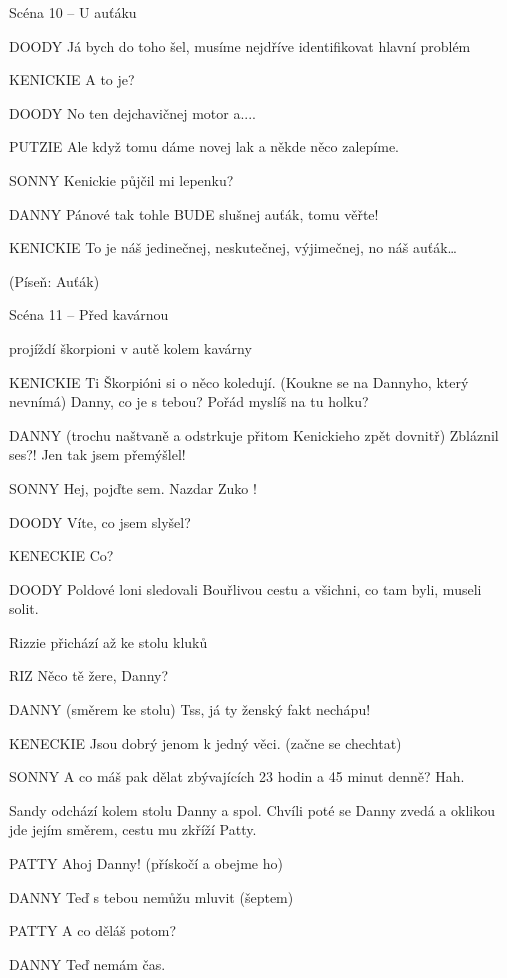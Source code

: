 Scéna 10 – U auťáku

DOODY        Já bych do toho šel, musíme nejdříve identifikovat hlavní problém

KENICKIE        A to je?

DOODY        No ten dejchavičnej motor a.... 

PUTZIE         Ale když tomu dáme novej lak a někde něco zalepíme. 

SONNY        Kenickie půjčil mi lepenku? 

DANNY         Pánové tak tohle BUDE  slušnej auťák, tomu věřte!

KENICKIE        To je náš jedinečnej, neskutečnej, výjimečnej, no náš auťák…

                 (Píseň: Auťák) 

Scéna 11 – Před kavárnou 

projíždí škorpioni v autě kolem kavárny 

KENICKIE         Ti Škorpióni si o něco koledují. (Koukne se na Dannyho, který nevnímá)                 Danny, co je s tebou? Pořád myslíš na tu holku?

DANNY         (trochu naštvaně a odstrkuje přitom Kenickieho zpět dovnitř) Zbláznil         ses?! Jen tak jsem přemýšlel! 

SONNY         Hej, pojďte sem. Nazdar Zuko !  

DOODY         Víte, co jsem slyšel? 

KENECKIE        Co? 

DOODY         Poldové loni sledovali Bouřlivou cestu a všichni, co tam byli, museli solit. 

Rizzie přichází až ke stolu kluků 

RIZ         Něco tě žere, Danny? 

DANNY        (směrem ke stolu) Tss, já ty ženský fakt nechápu! 

KENECKIE        Jsou dobrý jenom k jedný věci. (začne se chechtat) 

SONNY         A co máš pak dělat zbývajících 23 hodin a 45 minut denně? Hah. 

Sandy odchází kolem stolu Danny a spol. Chvíli poté se Danny zvedá a oklikou jde jejím směrem, cestu mu zkříží Patty. 

PATTY        Ahoj Danny! (přískočí a obejme ho) 

DANNY        Teď s tebou nemůžu mluvit (šeptem) 

PATTY         A co děláš potom? 

DANNY         Teď nemám čas.

